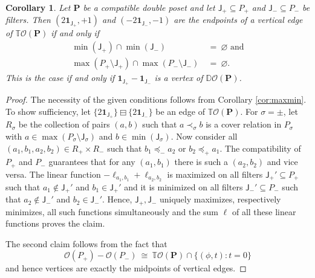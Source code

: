 \documentclass[11pt]{amsart}
\newtheorem{cor}[thm]{Corollary}
\theoremstyle{definition}
\begin{document}
\begin{cor}\label{cor:TO_vertical_edges}
    Let ${\mathbf{P}}$ be a compatible double poset and let ${\mathsf{J}}_+ \subseteq {P}_+$
    and ${\mathsf{J}}_- \subseteq {P}_-$ be filters.  Then $(2{\mathbf{1}}_{{\mathsf{J}}_+},+1)$
    and $(-2{\mathbf{1}}_{{\mathsf{J}}_-},-1)$ are the endpoints of a vertical edge of
    ${{\mathbb{T}}{\mathcal{O}({\mathbf{P}})}}$ if and only if
    \begin{align*}
        \min({\mathsf{J}}_+) \cap \min({\mathsf{J}}_-) \ &= \ {\varnothing} \text{ and}\\
        \max({P}_+ \setminus {\mathsf{J}}_+) \cap \max({P}_- \setminus {\mathsf{J}}_-) \
        &= \ {\varnothing}.
    \end{align*}
    This is the case if and only if ${\mathbf{1}}_{{\mathsf{J}}_+} - {\mathbf{1}}_{{\mathsf{J}}_-}$ is a
    vertex of ${\mathbb{D}{\mathcal{O}({\mathbf{P}})}}$.
\end{cor}
\begin{proof}
    The necessity of the given conditions follows from Corollary
    \ref{cor:maxmin}. To show sufficiency, let
    ${{{\{2{\mathbf{1}}_{{\mathsf{J}}_+}\}} \boxminus {\{2{\mathbf{1}}_{{\mathsf{J}}_-}\}}}}$ be an edge of
    ${{\mathbb{T}}{\mathcal{O}({\mathbf{P}})}}$.  For $\sigma=\pm$, let $R_\sigma$ be the collection of
    pairs $(a,b)$ such that $a \prec_\sigma b$ is a cover relation in
    ${P}_\sigma$ with $a \in \max({P}_\sigma \setminus {\mathsf{J}}_\sigma)$ and $b
    \in \min({\mathsf{J}}_\sigma)$.  Now consider all $(a_1,b_1,a_2,b_2) \in R_+
    \times R_-$ such that $b_1 \preceq_- a_2$ or $b_2 \preceq_+ a_1$. The
    compatibility of ${P}_+$ and ${P}_-$ guarantees that for any $(a_1,b_1)$
    there is such a $(a_2,b_2)$ and vice versa. The linear function $-
    \ell_{a_1,b_1} + \ell_{a_2,b_2}$ is maximized on all filters
    ${\mathsf{J}}_+'\subseteq{P}_+$ such that $a_1 \not\in {\mathsf{J}}_+'$ and $b_1 \in
    {\mathsf{J}}_+'$ and it is minimized on all filters ${\mathsf{J}}_-'\subseteq{P}_-$
    such that $a_2 \not\in {\mathsf{J}}_-'$ and $b_2\in {\mathsf{J}}_-'$. Hence,
    ${\mathsf{J}}_+, {\mathsf{J}}_-$ uniquely maximizes, respectively minimizes, all
    such functions simultaneously and the sum $\ell$ of all these linear
    functions proves the claim.

    The second claim follows from the fact that 
    \[
        {\mathcal{O}({{P}_+})}-{\mathcal{O}({{P}_-})} \ \cong \ {{\mathbb{T}}{\mathcal{O}({\mathbf{P}})}} \cap
        \{(\phi,t) : t = 0\}
    \]  
    and hence vertices are exactly the midpoints of vertical edges.
\end{proof}
\end{document}
